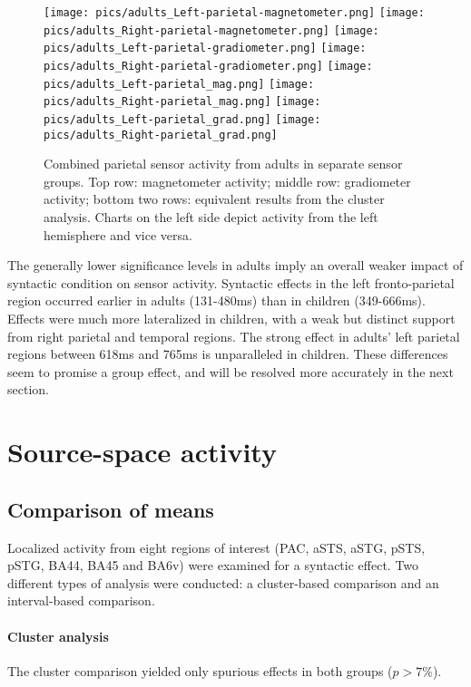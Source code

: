\begin{figure}[h]
\begin{center}
\texttt{[image: pics/adults\_Left-parietal-magnetometer.png]}
\texttt{[image: pics/adults\_Right-parietal-magnetometer.png]}
\texttt{[image: pics/adults\_Left-parietal-gradiometer.png]}
\texttt{[image: pics/adults\_Right-parietal-gradiometer.png]}
\texttt{[image: pics/adults\_Left-parietal\_mag.png]}
\texttt{[image: pics/adults\_Right-parietal\_mag.png]}
\texttt{[image: pics/adults\_Left-parietal\_grad.png]}
\texttt{[image: pics/adults\_Right-parietal\_grad.png]}
\caption{\label{4.2.activity.adults.parietal} Combined parietal sensor activity from adults in separate sensor groups. Top row: magnetometer activity; middle row: gradiometer activity; bottom two rows: equivalent results from the cluster analysis. Charts on the left side depict activity from the left hemisphere and vice versa.}
\end{center}
\end{figure}


The generally lower significance levels in adults imply an overall weaker impact of syntactic condition on sensor activity.
Syntactic effects in the left fronto-parietal region occurred earlier in adults (131-480ms) than in children (349-666ms).
Effects were much more lateralized in children, with a weak but distinct support from right parietal and temporal regions.
The strong effect in adults' left parietal regions between 618ms and 765ms is unparalleled in children.
These differences seem to promise a group effect, and will be resolved more accurately in the next section.

\section{Source-space activity}

\subsection{Comparison of means}
Localized activity from eight regions of interest (PAC, aSTS, aSTG, pSTS, pSTG, BA44, BA45 and BA6v) were examined for a syntactic effect.
Two different types of analysis were conducted: a cluster-based comparison and an interval-based comparison.

\paragraph{Cluster analysis}
The cluster comparison yielded only spurious effects in both groups ($p > 7\%$).

